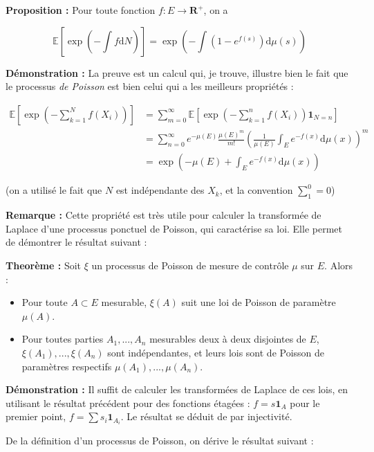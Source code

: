 \documentclass[12pt]{article}
\let\oldsum\sum
\renewcommand{\sum}{\oldsum\limits}
\begin{document}
\textbf{Proposition :} Pour toute fonction $f : E \to \mathbf R^+ $, on a 

$$ \mathbb E\left[ \exp ( - \int f \mathrm d N) \right] = \exp \left( - \int (1-e^{f(s)}) \mathrm d \mu(s) \right) $$

\textbf{Démonstration :} La preuve est un calcul qui, je trouve, illustre bien le fait que le processus \textit{de Poisson} est bien celui qui a les meilleurs propriétés :

\begin{align*} \mathbb E\left[ \exp \left( - \sum_{k=1}^N f(X_i) \right) \right] &= \sum_{m=0}^\infty \mathbb E\left[ \exp \left( - \sum_{k=1}^n f(X_i) \right) \mathbf 1_{N = n} \right] \\ &= \sum_{n=0}^\infty e^{-\mu(E)} \frac{\mu(E)^m}{m!} \left( \frac{1}{\mu(E)} \int_E e^{-f(x)} \mathrm d \mu (x) \right)^m \\ &= \exp\left(-\mu(E) + \int_E e^{-f(x)} \mathrm d \mu(x) \right) \end{align*}

(on a utilisé le fait que $N$ est indépendante des $X_k$, et la convention $ \sum_1^0 = 0 $)
  
\textbf{Remarque :} Cette propriété est très utile pour calculer la transformée de Laplace d'une processus ponctuel de Poisson, qui caractérise sa loi. Elle permet de démontrer le résultat suivant :

\textbf{Theorème :} Soit $\xi$ un processus de Poisson de mesure de contrôle $\mu$ sur $E$. Alors :

\begin{itemize}

  \item Pour toute $A \subset E$ mesurable, $\xi(A)$ suit une loi de Poisson de paramètre $\mu(A)$.
  
  \item Pour toutes parties $A_1,...,A_n$ mesurables deux à deux disjointes de $E$, $\xi(A_1),...,\xi(A_n) $ sont indépendantes, et leurs lois sont de Poisson de paramètres respectifs $\mu(A_1),...,\mu(A_n)$.

\end{itemize}

\textbf{Démonstration :} Il suffit de calculer les transformées de Laplace de ces lois, en utilisant le résultat précédent pour des fonctions étagées : $f = s \mathbf 1_{A}$ pour le premier point, $f = \sum s_i \mathbf 1_{A_i}$. Le résultat se déduit de par injectivité.

De la définition d'un processus de Poisson, on dérive le résultat suivant :
\end{document}
